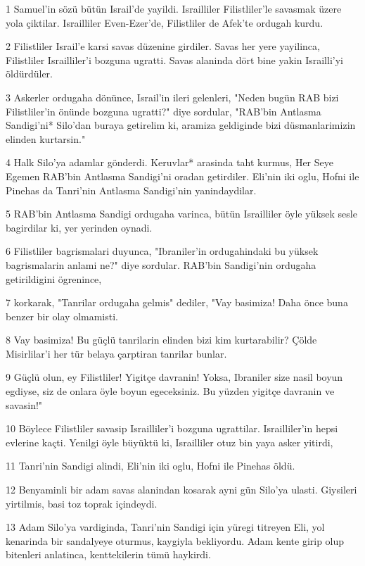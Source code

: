 \par 1 Samuel'in sözü bütün Israil'de yayildi. Israilliler Filistliler'le savasmak üzere yola çiktilar. Israilliler Even-Ezer'de, Filistliler de Afek'te ordugah kurdu.
\par 2 Filistliler Israil'e karsi savas düzenine girdiler. Savas her yere yayilinca, Filistliler Israilliler'i bozguna ugratti. Savas alaninda dört bine yakin Israilli'yi öldürdüler.
\par 3 Askerler ordugaha dönünce, Israil'in ileri gelenleri, "Neden bugün RAB bizi Filistliler'in önünde bozguna ugratti?" diye sordular, "RAB'bin Antlasma Sandigi'ni* Silo'dan buraya getirelim ki, aramiza geldiginde bizi düsmanlarimizin elinden kurtarsin."
\par 4 Halk Silo'ya adamlar gönderdi. Keruvlar* arasinda taht kurmus, Her Seye Egemen RAB'bin Antlasma Sandigi'ni oradan getirdiler. Eli'nin iki oglu, Hofni ile Pinehas da Tanri'nin Antlasma Sandigi'nin yanindaydilar.
\par 5 RAB'bin Antlasma Sandigi ordugaha varinca, bütün Israilliler öyle yüksek sesle bagirdilar ki, yer yerinden oynadi.
\par 6 Filistliler bagrismalari duyunca, "Ibraniler'in ordugahindaki bu yüksek bagrismalarin anlami ne?" diye sordular. RAB'bin Sandigi'nin ordugaha getirildigini ögrenince,
\par 7 korkarak, "Tanrilar ordugaha gelmis" dediler, "Vay basimiza! Daha önce buna benzer bir olay olmamisti.
\par 8 Vay basimiza! Bu güçlü tanrilarin elinden bizi kim kurtarabilir? Çölde Misirlilar'i her tür belaya çarptiran tanrilar bunlar.
\par 9 Güçlü olun, ey Filistliler! Yigitçe davranin! Yoksa, Ibraniler size nasil boyun egdiyse, siz de onlara öyle boyun egeceksiniz. Bu yüzden yigitçe davranin ve savasin!"
\par 10 Böylece Filistliler savasip Israilliler'i bozguna ugrattilar. Israilliler'in hepsi evlerine kaçti. Yenilgi öyle büyüktü ki, Israilliler otuz bin yaya asker yitirdi,
\par 11 Tanri'nin Sandigi alindi, Eli'nin iki oglu, Hofni ile Pinehas öldü.
\par 12 Benyaminli bir adam savas alanindan kosarak ayni gün Silo'ya ulasti. Giysileri yirtilmis, basi toz toprak içindeydi.
\par 13 Adam Silo'ya vardiginda, Tanri'nin Sandigi için yüregi titreyen Eli, yol kenarinda bir sandalyeye oturmus, kaygiyla bekliyordu. Adam kente girip olup bitenleri anlatinca, kenttekilerin tümü haykirdi.
